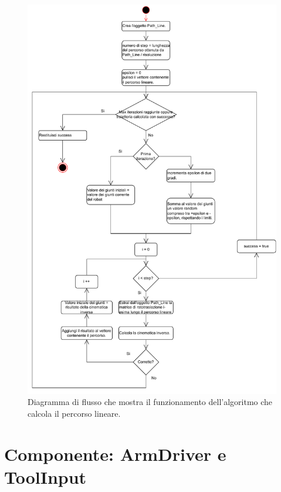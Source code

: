 \begin{figure}[ht!]
	\centering
	\includegraphics[width=0.8\linewidth]{./ImageFiles/ComputeLinearTrajectory.drawio.pdf}	\caption{Diagramma di flusso che mostra il funzionamento dell'algoritmo che calcola il percorso lineare.}
	\label{fig:algorithm}
\end{figure}

\clearpage
\section{Componente: ArmDriver e ToolInput}
